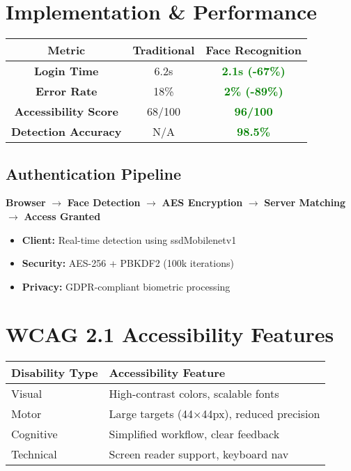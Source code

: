 \documentclass[a0,portrait]{hogent-poster}
\begin{document}
\begin{multicols}{2}
\section{Implementation \& Performance}

\begin{center}
\begin{tabular}{|c|c|c|}
\hline
\textbf{Metric} & \textbf{Traditional} & \textbf{Face Recognition} \\
\hline
\textbf{Login Time} & 6.2s & \textcolor{green}{\textbf{2.1s (-67\%)}} \\
\hline
\textbf{Error Rate} & 18\% & \textcolor{green}{\textbf{2\% (-89\%)}} \\
\hline
\textbf{Accessibility Score} & 68/100 & \textcolor{green}{\textbf{96/100}} \\
\hline
\textbf{Detection Accuracy} & N/A & \textcolor{green}{\textbf{98.5\%}} \\
\hline
\end{tabular}
\end{center}

\vspace{0.5cm}

\subsection{Authentication Pipeline}
\begin{center}
\textbf{Browser} $\rightarrow$ \textbf{Face Detection} $\rightarrow$ \textbf{AES Encryption} $\rightarrow$ \textbf{Server Matching} $\rightarrow$ \textbf{Access Granted}
\end{center}

\begin{itemize}
  \item \textbf{Client:} Real-time detection using ssdMobilenetv1
  \item \textbf{Security:} AES-256 + PBKDF2 (100k iterations)
  \item \textbf{Privacy:} GDPR-compliant biometric processing
\end{itemize}

\section{WCAG 2.1 Accessibility Features}

\begin{center}
\begin{tabular}{|l|l|}
\hline
\textbf{Disability Type} & \textbf{Accessibility Feature} \\
\hline
Visual & High-contrast colors, scalable fonts \\
\hline
Motor & Large targets (44×44px), reduced precision \\
\hline
Cognitive & Simplified workflow, clear feedback \\
\hline
Technical & Screen reader support, keyboard nav \\
\hline
\end{tabular}
\end{center}


\end{multicols}
\end{document}
